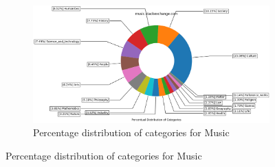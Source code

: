 \begin{figure}[H]
    \begin{subfigure}{0.9\textwidth}
    \centering
        \includegraphics[width=1\linewidth]{imgs/percentual-distribution/music_stackexchange_com_donut}
        \caption{Percentage distribution of categories for Music}
        \label{fig:percentage-distribution-music}
    \end{subfigure}
 

 
\end{figure}
 
